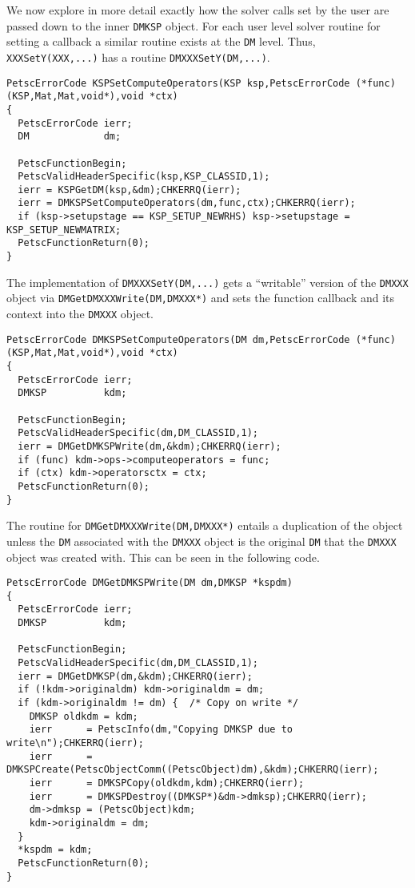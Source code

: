 We now explore in more detail exactly how the solver calls set by the user are passed down to the inner \lstinline{DMKSP} object. For each user
level solver routine for setting a callback a similar routine exists at the \lstinline{DM} level. Thus, \lstinline{XXXSetY(XXX,...)} has a routine \lstinline{DMXXXSetY(DM,...)}.
\begin{lstlisting}
PetscErrorCode KSPSetComputeOperators(KSP ksp,PetscErrorCode (*func)(KSP,Mat,Mat,void*),void *ctx)
{
  PetscErrorCode ierr;
  DM             dm;

  PetscFunctionBegin;
  PetscValidHeaderSpecific(ksp,KSP_CLASSID,1);
  ierr = KSPGetDM(ksp,&dm);CHKERRQ(ierr);
  ierr = DMKSPSetComputeOperators(dm,func,ctx);CHKERRQ(ierr);
  if (ksp->setupstage == KSP_SETUP_NEWRHS) ksp->setupstage = KSP_SETUP_NEWMATRIX;
  PetscFunctionReturn(0);
}
\end{lstlisting}
The implementation of \lstinline{DMXXXSetY(DM,...)} gets a ``writable'' version of the \lstinline{DMXXX} object via \lstinline{DMGetDMXXXWrite(DM,DMXXX*)} and sets the function callback
and its context into the \lstinline{DMXXX} object.
\begin{lstlisting}
PetscErrorCode DMKSPSetComputeOperators(DM dm,PetscErrorCode (*func)(KSP,Mat,Mat,void*),void *ctx)
{
  PetscErrorCode ierr;
  DMKSP          kdm;

  PetscFunctionBegin;
  PetscValidHeaderSpecific(dm,DM_CLASSID,1);
  ierr = DMGetDMKSPWrite(dm,&kdm);CHKERRQ(ierr);
  if (func) kdm->ops->computeoperators = func;
  if (ctx) kdm->operatorsctx = ctx;
  PetscFunctionReturn(0);
}
\end{lstlisting}
The routine for \lstinline{DMGetDMXXXWrite(DM,DMXXX*)} entails a duplication of the object unless the \lstinline{DM} associated with the \lstinline{DMXXX} object is the original \lstinline{DM} that
the \lstinline{DMXXX} object was created with. This can be seen in the following code.
\begin{lstlisting}
PetscErrorCode DMGetDMKSPWrite(DM dm,DMKSP *kspdm)
{
  PetscErrorCode ierr;
  DMKSP          kdm;

  PetscFunctionBegin;
  PetscValidHeaderSpecific(dm,DM_CLASSID,1);
  ierr = DMGetDMKSP(dm,&kdm);CHKERRQ(ierr);
  if (!kdm->originaldm) kdm->originaldm = dm;
  if (kdm->originaldm != dm) {  /* Copy on write */
    DMKSP oldkdm = kdm;
    ierr      = PetscInfo(dm,"Copying DMKSP due to write\n");CHKERRQ(ierr);
    ierr      = DMKSPCreate(PetscObjectComm((PetscObject)dm),&kdm);CHKERRQ(ierr);
    ierr      = DMKSPCopy(oldkdm,kdm);CHKERRQ(ierr);
    ierr      = DMKSPDestroy((DMKSP*)&dm->dmksp);CHKERRQ(ierr);
    dm->dmksp = (PetscObject)kdm;
    kdm->originaldm = dm;
  }
  *kspdm = kdm;
  PetscFunctionReturn(0);
}
\end{lstlisting}

